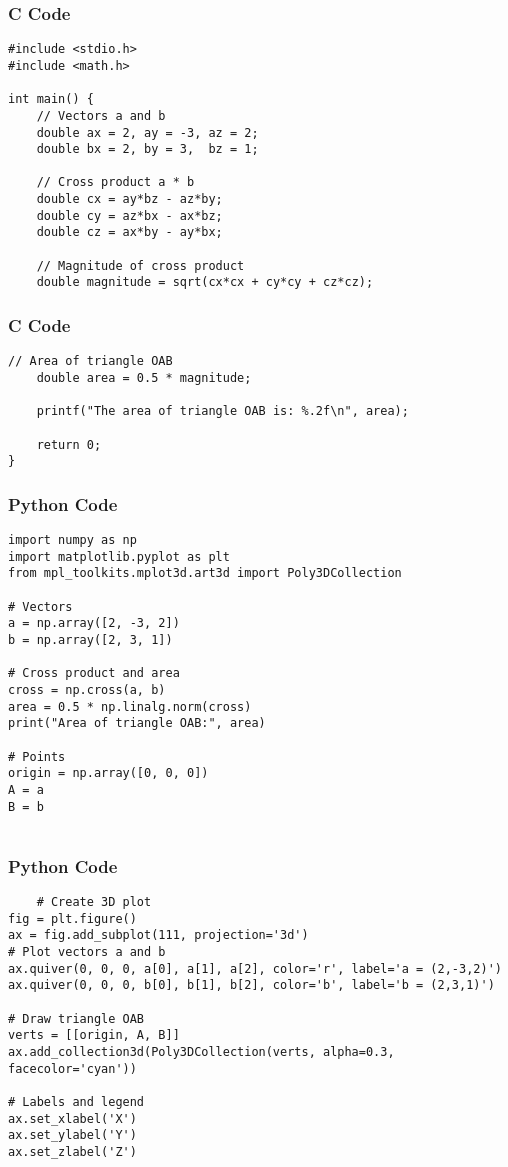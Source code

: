 \documentclass{beamer}
\begin{document}
\begin{frame}[fragile]
    \frametitle{C Code}
    \begin{lstlisting}
#include <stdio.h>
#include <math.h>

int main() {
    // Vectors a and b
    double ax = 2, ay = -3, az = 2;
    double bx = 2, by = 3,  bz = 1;

    // Cross product a * b
    double cx = ay*bz - az*by;
    double cy = az*bx - ax*bz;
    double cz = ax*by - ay*bx;

    // Magnitude of cross product
    double magnitude = sqrt(cx*cx + cy*cy + cz*cz);

     \end{lstlisting}
\end{frame}
\begin{frame}[fragile]
    \frametitle{C Code }
    \begin{lstlisting}
// Area of triangle OAB
    double area = 0.5 * magnitude;

    printf("The area of triangle OAB is: %.2f\n", area);

    return 0;
}
    \end{lstlisting}
\end{frame}
\begin{frame}[fragile]
    \frametitle{Python Code}
    \begin{lstlisting}
import numpy as np
import matplotlib.pyplot as plt
from mpl_toolkits.mplot3d.art3d import Poly3DCollection

# Vectors
a = np.array([2, -3, 2])
b = np.array([2, 3, 1])

# Cross product and area
cross = np.cross(a, b)
area = 0.5 * np.linalg.norm(cross)
print("Area of triangle OAB:", area)

# Points
origin = np.array([0, 0, 0])
A = a
B = b


    \end{lstlisting}
\end{frame}

\begin{frame}[fragile]
    \frametitle{Python Code}
    \begin{lstlisting}
    # Create 3D plot
fig = plt.figure()
ax = fig.add_subplot(111, projection='3d')
# Plot vectors a and b
ax.quiver(0, 0, 0, a[0], a[1], a[2], color='r', label='a = (2,-3,2)')
ax.quiver(0, 0, 0, b[0], b[1], b[2], color='b', label='b = (2,3,1)')

# Draw triangle OAB
verts = [[origin, A, B]]
ax.add_collection3d(Poly3DCollection(verts, alpha=0.3, facecolor='cyan'))

# Labels and legend
ax.set_xlabel('X')
ax.set_ylabel('Y')
ax.set_zlabel('Z')

    \end{lstlisting}
\end{frame}
\end{document}
